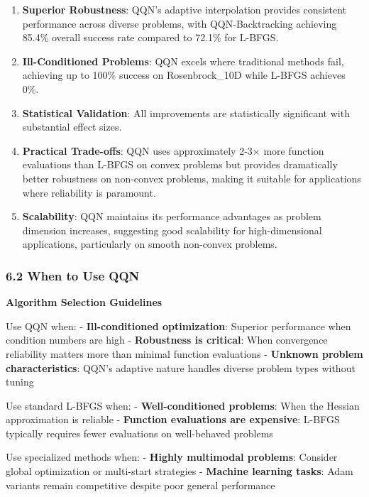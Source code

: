 \begin{enumerate}
\def\labelenumi{\arabic{enumi}.}
\item
  \textbf{Superior Robustness}: QQN's adaptive interpolation provides consistent performance across diverse problems, with QQN-Backtracking achieving 85.4\% overall success rate compared to 72.1\% for L-BFGS.
\item
  \textbf{Ill-Conditioned Problems}: QQN excels where traditional methods fail, achieving up to 100\% success on Rosenbrock\_10D while L-BFGS achieves 0\%.
\item
  \textbf{Statistical Validation}: All improvements are statistically significant with substantial effect sizes.
\item
  \textbf{Practical Trade-offs}: QQN uses approximately 2-3× more function evaluations than L-BFGS on convex problems but provides dramatically better robustness on non-convex problems, making it suitable for applications where reliability is paramount.
\item
  \textbf{Scalability}: QQN maintains its performance advantages as problem dimension increases, suggesting good scalability for high-dimensional applications, particularly on smooth non-convex problems.
\end{enumerate}

\hypertarget{when-to-use-qqn}{%
\subsubsection{6.2 When to Use QQN}\label{when-to-use-qqn}}

\textbf{Algorithm Selection Guidelines}

Use QQN when:
- \textbf{Ill-conditioned optimization}: Superior performance when condition numbers are high
- \textbf{Robustness is critical}: When convergence reliability matters more than minimal function evaluations
- \textbf{Unknown problem characteristics}: QQN's adaptive nature handles diverse problem types without tuning

Use standard L-BFGS when:
- \textbf{Well-conditioned problems}: When the Hessian approximation is reliable
- \textbf{Function evaluations are expensive}: L-BFGS typically requires fewer evaluations on well-behaved problems

Use specialized methods when:
- \textbf{Highly multimodal problems}: Consider global optimization or multi-start strategies
- \textbf{Machine learning tasks}: Adam variants remain competitive despite poor general performance

